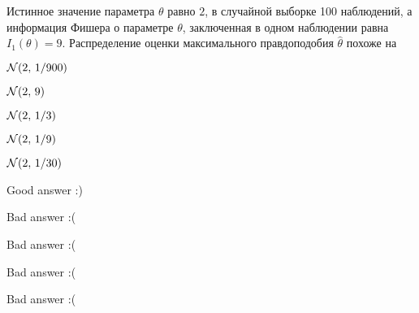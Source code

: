 
\begin{question}
Истинное значение параметра \(\theta\) равно \(2\), в случайной выборке
100 наблюдений, а информация Фишера о параметре \(\theta\), заключенная
в одном наблюдении равна \(I_1(\theta) = 9\). Распределение оценки
максимального правдоподобия \(\hat{\theta}\) похоже на
\begin{answerlist}
  \item \(\mathcal{N}(2, \, 1/900)\)
  \item \(\mathcal{N}(2, \, 9)\)
  \item \(\mathcal{N}(2, \, 1/3)\)
  \item \(\mathcal{N}(2, \, 1/9)\)
  \item \(\mathcal{N}(2, \, 1/30)\)
\end{answerlist}
\end{question}

\begin{solution}
\begin{answerlist}
  \item Good answer :)
  \item Bad answer :(
  \item Bad answer :(
  \item Bad answer :(
  \item Bad answer :(
\end{answerlist}
\end{solution}

